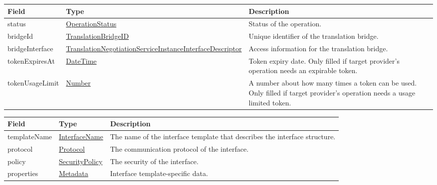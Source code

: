 \documentclass[a4paper]{arrowhead}
\newcommand{\pref}[1]{{\textcolor{ArrowheadGrey}{\hyperref[sec:model:primitives:#1]{#1}}}}
\begin{document}

\begin{table}[ht!]
\begin{tabularx}{\textwidth}{| p{4.25cm} | p{5.5cm} | X |} \hline
\rowcolor{gray!33} Field & Type      & Description \\ \hline
status & \pref{OperationStatus} & Status of the operation. \\ \hline
bridgeId & \pref{TranslationBridgeID} & Unique identifier of the translation bridge. \\ \hline
bridgeInterface & \hyperref[sec:model:TranslationNegotiationServiceInstanceInterfaceDescriptor]{Translation\-Negotiation\-Service\-Instance\-Interface\-Descriptor}  & Access information for the translation bridge. \\ \hline
tokenExpiresAt & \pref{DateTime} & Token expiry date. Only filled if target pro\-vider's operation needs an expirable token. \\ \hline
tokenUsageLimit & \pref{Number} & A number about how many times a token can be used. Only filled if target provider's operation needs a usage limited token. \\ \hline
\end{tabularx}
\end{table}


\begin{table}[ht!]
\begin{tabularx}{\textwidth}{| p{3.9cm} | p{4cm} | X |} \hline
\rowcolor{gray!33} Field & Type & Description \\ \hline
templateName & \pref{InterfaceName} & The name of the interface template that describes the interface structure. \\ \hline
protocol & \pref{Protocol} & The communication protocol of the interface. \\ \hline
policy & \pref{SecurityPolicy} & The security of the interface. \\ \hline
properties &\hyperref[sec:model:Metadata]{Metadata} & Interface template-specific data. \\ \hline
\end{tabularx}
\end{table}

\clearpage

 
\end{document}
